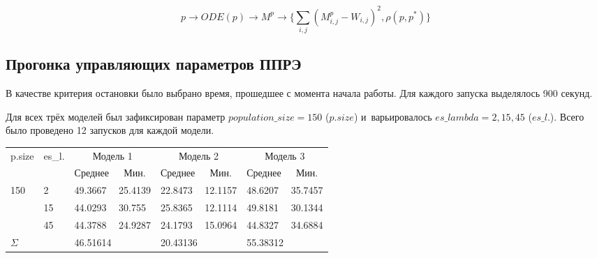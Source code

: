 \[ 
p \rightarrow ODE(p) \rightarrow M^p 
\rightarrow \{ \sum\limits_{i,j}(M_{i,j}^p - W_{i,j})^2 , \rho(p,p^*) \}
\]

\subsection{Прогонка управляющих параметров ППРЭ} \label{s3_2}

В качестве критерия остановки было выбрано время, прошедшее с момента начала 
работы. Для каждого запуска выделялось 900 секунд. 

Для всех трёх моделей был зафиксирован параметр $population\_size = 150$ 
($p.size$) и~варьировалось $es\_lambda = 2,15,45$ ($es\_l.$). Всего было 
проведено 12 запусков для каждой модели. 

\begin{table}[h]
\centering
\def\arraystretch{1.5} %
\begin{tabular}{|l|l|llllll|}
\hline %
  \multirow{2}{*}{p.size} & 
  \multirow{2}{*}{es\_l.} & 
  \multicolumn{2}{c|}{Модель 1} & 
  \multicolumn{2}{c|}{Модель 2} & 
  \multicolumn{2}{c|}{Модель 3} \\ \cline{3-8} 
  & & 
  \multicolumn{1}{c|}{Среднее} & 
  \multicolumn{1}{c|}{Мин.} & 
  \multicolumn{1}{c|}{Среднее} & 
  \multicolumn{1}{c|}{Мин.} & 
  \multicolumn{1}{c|}{Среднее} & 
  \multicolumn{1}{c|}{Мин.} \\ 

\hline %
\multirow{3}{*}{150} 
 & 2  & 49.3667 & 25.4139 & 22.8473 & 12.1157 & 48.6207 & 35.7457 \\ \cline{2-2}
 & 15 & 44.0293 & 30.755  & 25.8365 & 12.1114 & 49.8181 & 30.1344 \\ \cline{2-2}
 & 45 & 44.3788 & 24.9287 & 24.1793 & 15.0964 & 44.8327 & 34.6884 \\ 

\hline %
\multicolumn{2}{|l|}{$\Sigma$} & 
\multicolumn{2}{l|}{46.51614} & 
\multicolumn{2}{l|}{20.43136} & 
\multicolumn{2}{l|}{55.38312} \\ 

\hline %
\end{tabular}
\end{table}

